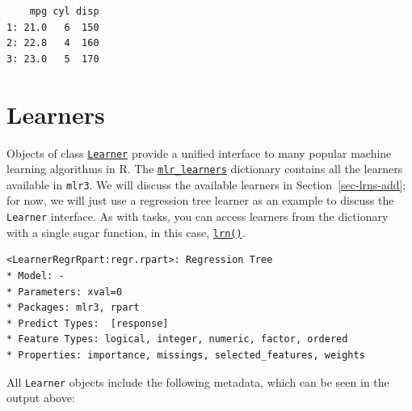 \begin{verbatim}
    mpg cyl disp
1: 21.0   6  150
2: 22.8   4  160
3: 23.0   5  170
\end{verbatim}

\hypertarget{sec-learners}{%
\section{Learners}\label{sec-learners}}

Objects of class
\href{https://mlr3.mlr-org.com/reference/Learner.html}{\texttt{Learner}}
provide a unified interface to many popular machine learning algorithms
in R. The
\href{https://mlr3.mlr-org.com/reference/mlr_learners.html}{\texttt{mlr\_learners}}
dictionary contains all the learners available in \texttt{mlr3}. We will
discuss the available learners in Section~\ref{sec-lrns-add}; for now,
we will just use a regression tree learner as an example to discuss the
\texttt{Learner} interface. As with tasks, you can access learners from
the dictionary with a single sugar function, in this case,
\href{https://mlr3.mlr-org.com/reference/mlr_sugar.html}{\texttt{lrn()}}.

\begin{Shaded}
\begin{Highlighting}[]
\NormalTok{(}\NormalTok{)}
\end{Highlighting}
\end{Shaded}

\begin{verbatim}
<LearnerRegrRpart:regr.rpart>: Regression Tree
* Model: -
* Parameters: xval=0
* Packages: mlr3, rpart
* Predict Types:  [response]
* Feature Types: logical, integer, numeric, factor, ordered
* Properties: importance, missings, selected_features, weights
\end{verbatim}

All \texttt{Learner} objects include the following metadata, which can
be seen in the output above:

